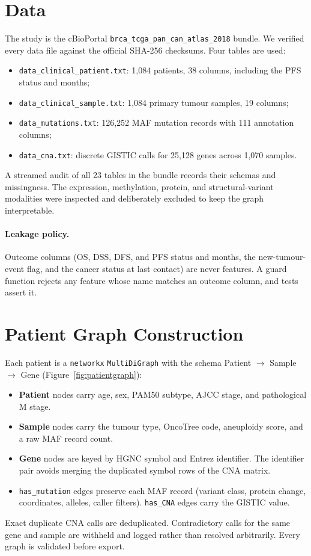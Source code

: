 \documentclass{mnnit}
\begin{document}
\section{Data}
The study is the cBioPortal \texttt{brca\_tcga\_pan\_can\_atlas\_2018} bundle. We verified every data file
against the official SHA-256 checksums. Four tables are used:
\begin{itemize}
  \item \texttt{data\_clinical\_patient.txt}: 1,084 patients, 38 columns, including the PFS status and months;
  \item \texttt{data\_clinical\_sample.txt}: 1,084 primary tumour samples, 19 columns;
  \item \texttt{data\_mutations.txt}: 126,252 MAF mutation records with 111 annotation columns;
  \item \texttt{data\_cna.txt}: discrete GISTIC calls for 25,128 genes across 1,070 samples.
\end{itemize}
A streamed audit of all 23 tables in the bundle records their schemas and missingness. The expression,
methylation, protein, and structural-variant modalities were inspected and deliberately excluded to keep the
graph interpretable.

\paragraph{Leakage policy.} Outcome columns (OS, DSS, DFS, and PFS status and months, the new-tumour-event flag,
and the cancer status at last contact) are never features. A guard function rejects any feature whose name
matches an outcome column, and tests assert it.

\section{Patient Graph Construction}
Each patient is a \texttt{networkx} \texttt{MultiDiGraph} with the schema
Patient $\rightarrow$ Sample $\rightarrow$ Gene (Figure~\ref{fig:patientgraph}):
\begin{itemize}
  \item \textbf{Patient} nodes carry age, sex, PAM50 subtype, AJCC stage, and pathological M stage.
  \item \textbf{Sample} nodes carry the tumour type, OncoTree code, aneuploidy score, and a raw MAF record count.
  \item \textbf{Gene} nodes are keyed by HGNC symbol and Entrez identifier. The identifier pair avoids merging the
        duplicated symbol rows of the CNA matrix.
  \item \texttt{has\_mutation} edges preserve each MAF record (variant class, protein change, coordinates,
        alleles, caller filters). \texttt{has\_CNA} edges carry the GISTIC value.
\end{itemize}
Exact duplicate CNA calls are deduplicated. Contradictory calls for the same gene and sample are withheld and
logged rather than resolved arbitrarily. Every graph is validated before export.
\end{document}
